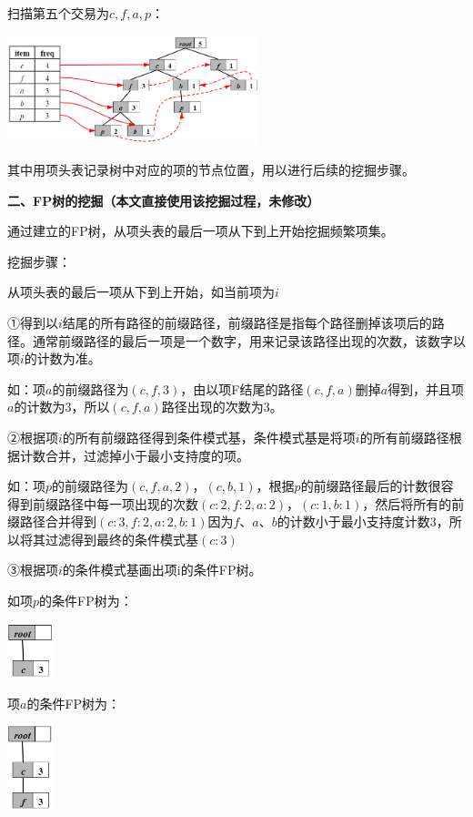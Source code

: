 \documentclass[UTF8,a4paper]{ctexart}
\begin{document}
  扫描第五个交易为{\color{red}$c,f,a,p$}：
  
  \includegraphics[width=0.55\textwidth]{5_trans}

  其中用项头表记录树中对应的项的节点位置，用以进行后续的挖掘步骤。

  \textbf{二、FP树的挖掘（本文直接使用该挖掘过程，未修改）}

  通过建立的FP树，从项头表的最后一项从下到上开始挖掘频繁项集。

  挖掘步骤：

  从项头表的最后一项从下到上开始，如当前项为$i$
  
  ①得到以$i$结尾的所有路径的前缀路径，前缀路径是指每个路径删掉该项后的路径。通常前缀路径的最后一项是一个数字，用来记录该路径出现的次数，该数字以项$i$的计数为准。

  如：项$a$的前缀路径为$(c,f,3)$，由以项F结尾的路径$(c,f,a)$删掉$a$得到，并且项$a$的计数为3，所以$(c,f,a)$路径出现的次数为3。

  ②根据项$i$的所有前缀路径得到条件模式基，条件模式基是将项$i$的所有前缀路径根据计数合并，过滤掉小于最小支持度的项。

  如：项$p$的前缀路径为$(c,f,a,2)$，$(c,b,1)$，根据$p$的前缀路径最后的计数很容得到前缀路径中每一项出现的次数$(c:2,f:2,a:2)$，$(c:1,b:1)$，然后将所有的前缀路径合并得到$(c:3,f:2,a:2,b:1)$因为$f、a、b$的计数小于最小支持度计数3，所以将其过滤得到最终的条件模式基$(c:3)$

  ③根据项$i$的条件模式基画出项i的条件FP树。

  如{\color{red}项$p$的条件FP树为}：

  \includegraphics[width=0.1\textwidth]{p_baseTree}

  {\color{red}项$a$的条件FP树为}：

  \includegraphics[width=0.1\textwidth]{a_baseTree}
\end{document}
